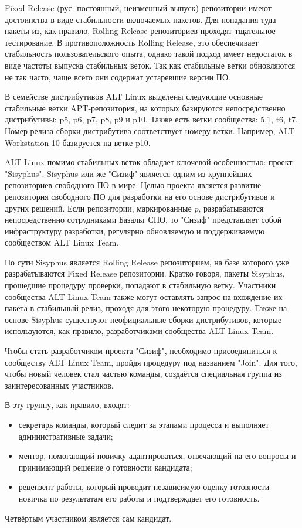 \documentclass[bachelor, och, pract]{SCWorks}
\begin{document}
Fixed Release (рус. постоянный, неизменный выпуск) репозитории имеют достоинства в виде стабильности включаемых пакетов.
Для попадания туда пакеты из, как правило, Rolling Release репозиториев проходят тщательное тестирование.
В противоположность Rolling Release, это обеспечивает стабильность пользовательского опыта, однако такой подход имеет недостаток в виде частоты выпуска стабильных веток.
Так как стабильные ветки обновляются не так часто, чаще всего они содержат устаревшие версии ПО.

В семействе дистрибутивов ALT Linux выделены следующие основные стабильные ветки APT-репозитория, на которых базируются непосредственно дистрибутивы: p5, p6, p7, p8, p9 и p10.
Также есть ветки сообщества: 5.1, t6, t7. Номер релиза сборки дистрибутива соответствует номеру ветки.
Например, ALT Workstation 10 базируется на ветке p10.

ALT Linux помимо стабильных веток обладает ключевой особенностью: проект "Sisyphus".
Sisyphus или же "Сизиф" является одним из крупнейших репозиториев свободного ПО в мире.
Целью проекта является развитие репозитория свободного ПО для разработки на его основе дистрибутивов и других решений.
Если репозитории, маркированные \textit{p}, разрабатываются непосредственно сотрудниками Базальт СПО, то "Сизиф" представляет собой инфраструктуру разработки,
регулярно обновляемую и поддерживаемую сообществом ALT Linux Team.

По сути Sisyphus является Rolling Release репозиторием, на базе которого уже разрабатываются Fixed Release репозитории.
Кратко говоря, пакеты Sisyphus, прошедшие процедуру проверки, попадают в стабильную ветку.
Участники сообщества ALT Linux Team также могут оставлять запрос на вхождение их пакета в стабильный релиз, проходя для этого некоторую процедуру.
Также на основе Sisyphus существуют неофициальные сборки дистрибутивов, которые используются, как правило, разработчиками сообщества ALT Linux Team.

Чтобы стать разработчиком проекта "Сизиф", необходимо присоединиться к сообществу ALT Linux Team, пройдя процедуру под названием "Join". 
Для того, чтобы новый человек стал частью команды, создаётся специальная группа из заинтересованных участников.

В эту группу, как правило, входят:
\begin{itemize}
    \item секретарь команды, который следит за этапами процесса и выполняет административные задачи;
    \item ментор, помогающий новичку адаптироваться, отвечающий на его вопросы и принимающий решение о готовности кандидата;
    \item рецензент работы, который проводит независимую оценку готовности новичка по результатам его работы и подтверждает его готовность.
\end{itemize}
Четвёртым участником является сам кандидат.
\end{document}
